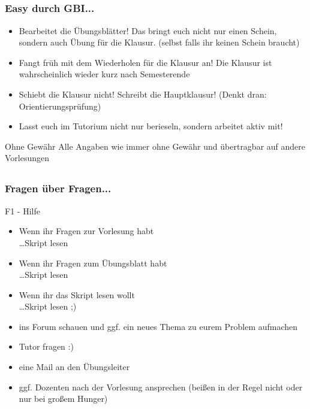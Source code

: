 \subsection*{}
\begin{frame}
	\frametitle{Easy durch GBI...}
	\begin{itemize}
		\item Bearbeitet die Übungsblätter! Das bringt euch nicht nur einen Schein,
		sondern auch Übung für die Klausur. (selbst falls ihr keinen Schein braucht)
		\pause
		\item Fangt früh mit dem Wiederholen für die Klausur an! Die Klausur ist wahrscheinlich wieder kurz nach Semesterende\pause
		\item Schiebt die Klausur nicht! Schreibt die Hauptklausur!
			(Denkt dran: Orientierungsprüfung)	\pause
		\item Lasst euch im Tutorium nicht nur berieseln, sondern arbeitet aktiv mit!
	\end{itemize}	\pause
 \begin{block}{Ohne Gewähr}
 	Alle Angaben wie immer ohne Gewähr und übertragbar auf andere Vorlesungen
 \end{block}
\end{frame}

\subsection*{}
\begin{frame}
\frametitle{Fragen über Fragen...}
\begin{block}{F1 - Hilfe}
	\begin{itemize}
  \item  Wenn ihr Fragen zur Vorlesung habt \\ \pause
          \ldots Skript lesen
  \item  Wenn ihr Fragen zum Übungsblatt habt \\ \pause
          \ldots Skript lesen
  \item  Wenn ihr das Skript lesen wollt \\ \pause
          \ldots Skript lesen ;) \pause
			\item ins Forum schauen und ggf. ein neues Thema zu eurem Problem aufmachen\pause
			\item Tutor fragen :)	\pause
			\item eine Mail an den Übungsleiter	\pause
			\item ggf. Dozenten nach der Vorlesung ansprechen (beißen in der Regel nicht oder nur bei großem Hunger)
	\end{itemize}
\end{block}
\end{frame}


